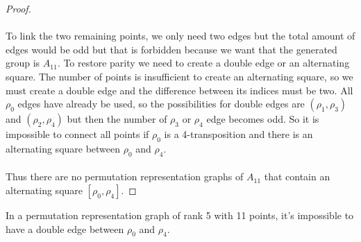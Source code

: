 \begin{proof}
  \paragraph{}
  To link the two remaining points, we only need two edges but the total amount of edges would be odd but that is forbidden because we want that the generated group is $A_{11}$. To restore parity we need to create a double edge or an alternating square. The number of points is insufficient to create an alternating square, so we must create a double edge and the difference between its indices must be two. All $\rho_0$ edges have already be used, so the possibilities for double edges are $(\rho_1, \rho_3)$ and $(\rho_2, \rho_4)$ but then the number of $\rho_3$ or $\rho_4$ edge becomes odd. So it is impossible to connect all points if $\rho_0$ is a 4-transposition and there is an alternating square between $\rho_0$ and $\rho_4$.

  \paragraph{}
  Thus there are no permutation representation graphs of $A_{11}$ that contain an alternating square $[\rho_0, \rho_4]$.
\end{proof}

\begin{lemma}
  \label{lemma-forbidden-double-edge}
  In a permutation representation graph of rank 5 with 11 points, it's impossible to have a double edge between $\rho_0$ and $\rho_4$.
\end{lemma}

